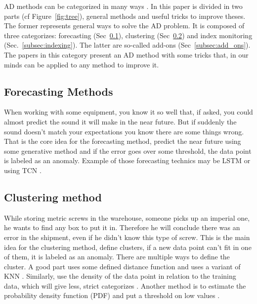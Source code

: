 \documentclass[../../main/main.tex]{subfiles}
\begin{document}
    \begin{figure*}[hp]
        \makebox[\textwidth]{}
        \caption{Anomaly detection method categorization}
        \label{fig:tree}
    \end{figure*}

    \ac{AD} methods can be categorized in many ways \cite{Choi.2021}. In this paper is divided in two parts (cf Figure~\ref{fig:tree}),
    general methods and useful tricks to improve theses. The former represents general ways to 
    solve the \ac{AD} problem. It is composed of three categorizes: forecasting (Sec~\ref{subsec:forecasting}), clustering (Sec~\ref{subsec:clustering}) and index monitoring (Sec.~\ref{subsec:indexing}).
    The latter are so-called add-ons (Sec~\ref{subsec:add_ons}). The papers in this category present an \ac{AD} method with some tricks that,
    in our minds can be applied to any method to improve it.
    \subsection{Forecasting Methods}\label{subsec:forecasting}
        When working with some equipment, you know it so well that, if asked, you could almost 
        predict the sound it will make in the near future. But if suddenly the sound doesn't match 
        your expectations you know there are some things wrong.
        That is the core idea for the forecasting method, predict the near future using some generative method
        and if the error goes over some threshold, the data point is labeled as an anomaly. Example of those forecasting technics
        may be \ac{LSTM} \cite{Hochreiter.1997} or using \ac{TCN} \cite{Bai.04.03.2018}. %
    
    \subsection{Clustering method}\label{subsec:clustering}
        While storing metric screws in the warehouse, someone picks up an imperial one, he wants to find any box to put it in.
        Therefore he will conclude there was an error in the shipment, even if he didn't know this type of screw. This is the main 
        idea for the clustering method, define clusters, if a new data point can't fit in one of them, it is labeled as an anomaly.
        There are multiple ways to define the cluster. A good part uses some defined distance \cite{D.Berndt.1994} function and uses a variant of \ac{KNN}
        \cite{M.Ester.1996}. Similarly, use the density of the data point in relation to the training data, which will 
        give less, strict categorizes \cite{Breunig.2000}. Another method is to estimate the probability density function (PDF) 
        and put a threshold on low values \cite{BoZong.2018}. %
    
\end{document}
